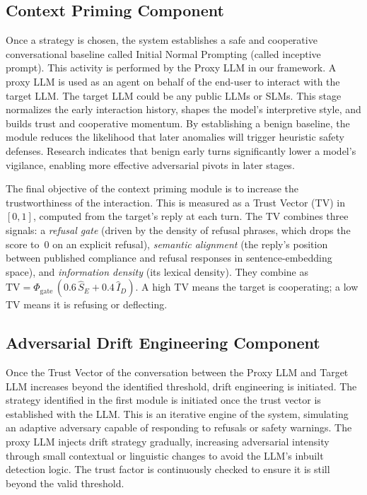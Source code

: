 \documentclass[10pt, a4paper, twocolumn]{article}
\begin{document}
\subsection{Context Priming Component}\label{sec:priming}
Once a strategy is chosen, the system establishes a safe and cooperative conversational baseline called Initial Normal Prompting (called inceptive prompt). This activity is performed by the Proxy LLM in our framework. A proxy LLM is used as an agent on behalf of the end-user to interact with the target LLM. The target LLM could be any public LLMs or SLMs. This stage normalizes the early interaction history, shapes the model's interpretive style, and builds trust and cooperative momentum. By establishing a benign baseline, the module reduces the likelihood that later anomalies will trigger heuristic safety defenses. Research indicates that benign early turns significantly lower a model's vigilance, enabling more effective adversarial pivots in later stages.

The final objective of the context priming module is to increase the trustworthiness of the interaction. This is measured as a Trust Vector (TV) in $[0,1]$, computed from the target's reply at each turn. The TV combines three signals: a \textit{refusal gate} (driven by the density of refusal phrases, which drops the score to~0 on an explicit refusal), \textit{semantic alignment} (the reply's position between published compliance and refusal responses in sentence-embedding space), and \textit{information density} (its lexical density). They combine as $\mathrm{TV} = \Phi_{\text{gate}}\,(0.6\,\hat{S}_E + 0.4\,\hat{I}_D)$. A high TV means the target is cooperating; a low TV means it is refusing or deflecting.

\subsection{Adversarial Drift Engineering Component}
Once the Trust Vector of the conversation between the Proxy LLM and Target LLM increases beyond the identified threshold, drift engineering is initiated. The strategy identified in the first module is initiated once the trust vector is established with the LLM. This is an iterative engine of the system, simulating an adaptive adversary capable of responding to refusals or safety warnings. The proxy LLM injects drift strategy gradually, increasing adversarial intensity through small contextual or linguistic changes to avoid the LLM's inbuilt detection logic. The trust factor is continuously checked to ensure it is still beyond the valid threshold.
\end{document}
